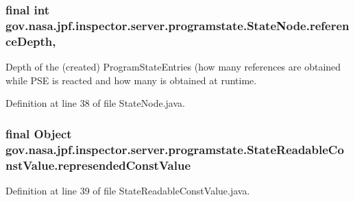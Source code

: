 \subsubsection[{\texorpdfstring{reference\+Depth}{referenceDepth}}]{\setlength{\rightskip}{0pt plus 5cm}final int gov.\+nasa.\+jpf.\+inspector.\+server.\+programstate.\+State\+Node.\+reference\+Depth\hspace{0.3cm}{\ttfamily [protected]}, {\ttfamily [inherited]}}\hypertarget{classgov_1_1nasa_1_1jpf_1_1inspector_1_1server_1_1programstate_1_1_state_node_a55683618625dae46e8aa68d95811d6bb}{}\label{classgov_1_1nasa_1_1jpf_1_1inspector_1_1server_1_1programstate_1_1_state_node_a55683618625dae46e8aa68d95811d6bb}


Depth of the (created) Program\+State\+Entries (how many references are obtained while P\+SE is reacted and how many is obtained at runtime. 



Definition at line 38 of file State\+Node.\+java.

\subsubsection[{\texorpdfstring{represended\+Const\+Value}{represendedConstValue}}]{\setlength{\rightskip}{0pt plus 5cm}final Object gov.\+nasa.\+jpf.\+inspector.\+server.\+programstate.\+State\+Readable\+Const\+Value.\+represended\+Const\+Value\hspace{0.3cm}{\ttfamily [private]}}\hypertarget{classgov_1_1nasa_1_1jpf_1_1inspector_1_1server_1_1programstate_1_1_state_readable_const_value_a7e85f716b7d7ea2faf2073cf63febc1b}{}\label{classgov_1_1nasa_1_1jpf_1_1inspector_1_1server_1_1programstate_1_1_state_readable_const_value_a7e85f716b7d7ea2faf2073cf63febc1b}


Definition at line 39 of file State\+Readable\+Const\+Value.\+java.

